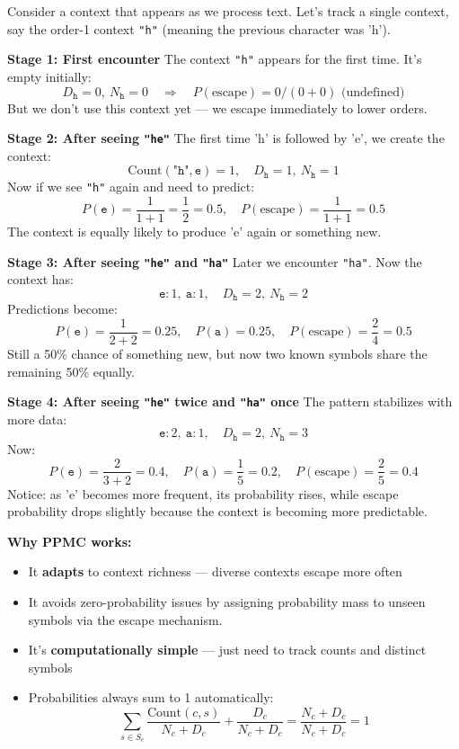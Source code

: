 \begin{examplebox}

Consider a context that appears as we process text. Let's track a single context,
say the order-1 context \texttt{"h"} (meaning the previous character was 'h').

\textbf{Stage 1: First encounter}
The context \texttt{"h"} appears for the first time. It's empty initially:
\[
D_{\texttt{h}} = 0,\ N_{\texttt{h}} = 0 \quad\Rightarrow\quad P(\text{escape}) = 0/(0+0) \text{ (undefined)}
\]
But we don't use this context yet — we escape immediately to lower orders.

\textbf{Stage 2: After seeing \texttt{"he"}}
The first time 'h' is followed by 'e', we create the context:
\[
\text{Count}(\texttt{"h"},\texttt{e}) = 1,\quad D_{\texttt{h}} = 1,\ N_{\texttt{h}} = 1
\]
Now if we see \texttt{"h"} again and need to predict:
\[
P(\texttt{e}) = \frac{1}{1 + 1} = \frac{1}{2} = 0.5,\quad
P(\text{escape}) = \frac{1}{1 + 1} = 0.5
\]
The context is equally likely to produce 'e' again or something new.

\textbf{Stage 3: After seeing \texttt{"he"} and \texttt{"ha"}}
Later we encounter \texttt{"ha"}. Now the context has:
\[
\texttt{e}:1,\ \texttt{a}:1,\quad D_{\texttt{h}} = 2,\ N_{\texttt{h}} = 2
\]
Predictions become:
\[
P(\texttt{e}) = \frac{1}{2+2} = 0.25,\quad
P(\texttt{a}) = 0.25,\quad
P(\text{escape}) = \frac{2}{4} = 0.5
\]
Still a 50\% chance of something new, but now two known symbols share the remaining
50\% equally.

\textbf{Stage 4: After seeing \texttt{"he"} twice and \texttt{"ha"} once}
The pattern stabilizes with more data:
\[
\texttt{e}:2,\ \texttt{a}:1,\quad D_{\texttt{h}} = 2,\ N_{\texttt{h}} = 3
\]
Now:
\[
P(\texttt{e}) = \frac{2}{3+2} = 0.4,\quad
P(\texttt{a}) = \frac{1}{5} = 0.2,\quad
P(\text{escape}) = \frac{2}{5} = 0.4
\]
Notice: as 'e' becomes more frequent, its probability rises, while escape probability
drops slightly because the context is becoming more predictable.
\end{examplebox}

\begin{importantbox}
\textbf{Why PPMC works:}
\begin{itemize}
    \item It \textbf{adapts} to context richness — diverse contexts escape more often
    \item It avoids zero-probability issues by assigning probability mass to unseen 
          symbols via the escape mechanism.
    \item It's \textbf{computationally simple} — just need to track counts and 
          distinct symbols
    \item Probabilities always sum to 1 automatically:
          \[
          \sum_{s \in S_c} \frac{\text{Count}(c,s)}{N_c + D_c} + \frac{D_c}{N_c + D_c}
          = \frac{N_c + D_c}{N_c + D_c} = 1
          \]
\end{itemize}
\end{importantbox}


